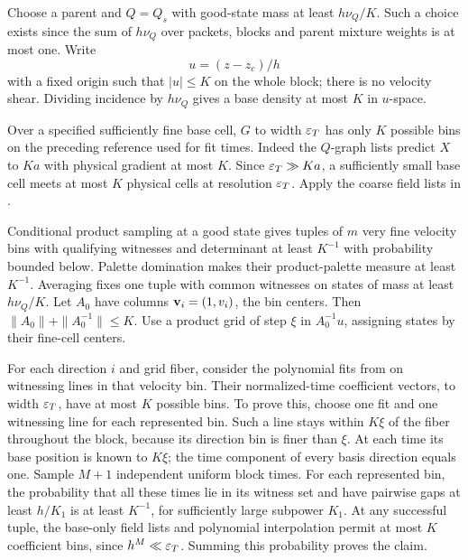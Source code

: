 Choose a parent and \(Q=Q_s\) with good-state mass at least
\(h\nu_Q/K\). Such a choice exists since the sum of \(h\nu_Q\)
over packets, blocks and parent mixture weights is at most one.
Write
\[
 u=(z-z_c)/h
\]
with a fixed origin such that \(|u|\leq K\) on the whole block;
there is no velocity shear. Dividing incidence by \(h\nu_Q\)
gives a base density at most \(K\) in \(u\)-space.

Over a specified sufficiently fine base cell, \(G\) to width
\(\varepsilon_T\) has only \(K\) possible bins on the preceding reference
used for fit times. Indeed the \(Q\)-graph lists predict \(X\)
to \(Ka\) with physical gradient at most \(K\).
Since \(\varepsilon_T\gg Ka\), a sufficiently small base cell meets at
most \(K\) physical cells at resolution \(\varepsilon_T\).
Apply the coarse field lists in .

Conditional product sampling at a good state gives tuples of
\(m\) very fine velocity bins with qualifying witnesses and
determinant at least \(K^{-1}\) with probability bounded below.
Palette domination makes their product-palette measure at least
\(K^{-1}\). Averaging fixes one tuple with common witnesses on
states of mass at least \(h\nu_Q/K\).
Let \(A_0\) have columns \({\bf v}_i=(1,v_i)\), the bin centers.
Then \(\|A_0\|+\|A_0^{-1}\|\leq K\).
Use a product grid of step \(\xi\) in \(A_0^{-1}u\), assigning
states by their fine-cell centers.

For each direction \(i\) and grid fiber, consider the polynomial
fits from  on witnessing lines in that
velocity bin. Their normalized-time coefficient vectors, to
width \(\varepsilon_T\), have at most \(K\) possible bins.
To prove this, choose one fit and one witnessing line for each
represented bin. Such a line stays within \(K\xi\) of the fiber
throughout the block, because its direction bin is finer than
\(\xi\). At each time its base position is known to \(K\xi\);
the time component of every basis direction equals one.
Sample \(M+1\) independent uniform block times.
For each represented bin, the probability that all these times
lie in its witness set and have pairwise gaps at least \(h/K_1\)
is at least \(K^{-1}\), for sufficiently large subpower \(K_1\).
At any successful tuple, the base-only field lists and polynomial
interpolation permit at most \(K\) coefficient bins, since
\(h^M\ll\varepsilon_T\). Summing this probability proves the claim.

